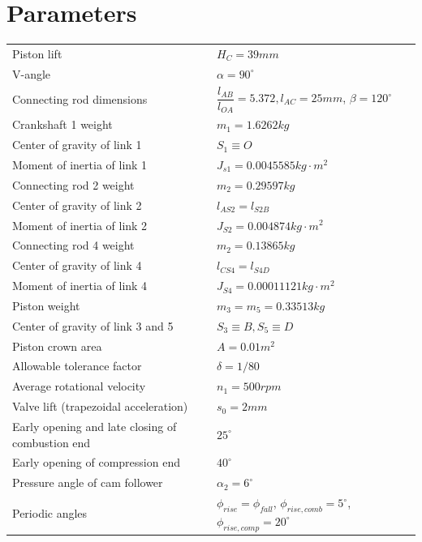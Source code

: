 \section{Parameters}
\begin{tabular}{p{0.5\linewidth}p{0.5\linewidth}}
	Piston lift & $ H_C=39\unit{mm} $\\
	V-angle&$ \alpha=90^\circ $\\
	Connecting rod dimensions  &$ \dfrac{l_{AB}}{l_{OA}} =5.372,l_{AC}=25mm$, $\beta=120^\circ$\\
	Crankshaft 1 weight&$ m_1=1.6262\unit{kg} $\\
	Center of gravity of link 1&$ S_1\equiv O $\\
	Moment of inertia of link 1&$ J_{s1}=0.0045585\unit{kg\cdot m^2} $\\
	Connecting rod 2 weight&$ m_2=0.29597\unit{kg} $\\
	Center of gravity of link 2&$ l_{AS2}=l_{S2B} $\\
	Moment of inertia of link 2&$ J_{S2}=0.004874\unit{kg\cdot m^2} $\\
	Connecting rod 4 weight&$ m_2=0.13865\unit{kg} $\\
	Center of gravity of link 4&$ l_{CS4}=l_{S4D} $\\
	Moment of inertia of link 4&$ J_{S4}=0.00011121\unit{kg\cdot m^2} $\\
	Piston weight&$ m_3=m_5=0.33513\unit{kg} $\\
	Center of gravity of link 3 and 5&$ S_3\equiv B, S_5\equiv D $\\
	Piston crown area&$ A=0.01\unit{m^2} $\\
	Allowable tolerance factor&$ \delta=1/80 $\\
	Average rotational velocity&$ n_1=500\unit{rpm} $\\
	Valve lift (trapezoidal acceleration)&$ s_0=2\unit{mm} $ \\
	Early opening and late closing of combustion end&$ 25^\circ $\\
	Early opening of compression end&$ 40^\circ $\\
	Pressure angle of cam follower&$ \alpha_2=6^\circ $\\
	Periodic angles&$ \phi_{rise}=\phi_{fall}$, $\phi_{rise,comb}=5^\circ$, $\phi_{rise,comp}=20^\circ $
\end{tabular}



